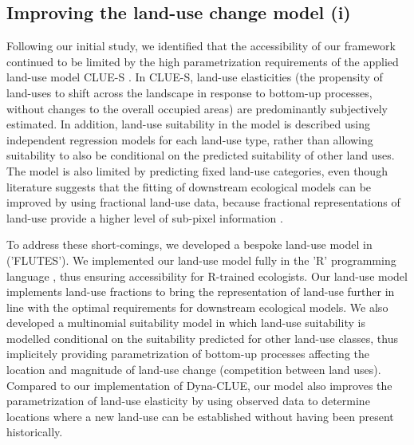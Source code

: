 \subsection{Improving the land-use change model (i)}
\label{ch5:section_lumodel}
Following our initial study, we identified that the accessibility of our framework continued to be limited by the high parametrization requirements of the applied land-use model CLUE-S \citep{verburg_modeling_2002}. In CLUE-S, land-use elasticities (the propensity of land-uses to shift across the landscape in response to bottom-up processes, without changes to the overall occupied areas) are predominantly subjectively estimated. In addition, land-use suitability in the model is described using independent regression models for each land-use type, rather than allowing suitability to also be conditional on the predicted suitability of other land uses. The model is also limited by predicting fixed land-use categories, even though literature suggests that the fitting of downstream ecological models can be improved by using fractional land-use data, because fractional representations of land-use provide a higher level of sub-pixel information  \citep[][]{bevanda_adding_2014, levers_drivers_2014, levers_drivers_2016}. 

To address these short-comings, we developed a bespoke land-use model in  ('FLUTES'). We implemented our land-use model fully in the 'R' programming language \citep{r_development_core_team_r_2008}, thus ensuring accessibility for R-trained ecologists. Our land-use model implements land-use fractions to bring the representation of land-use further in line with the optimal requirements for downstream ecological models. We also developed a multinomial suitability model in which land-use suitability is modelled conditional on the suitability predicted for other land-use classes, thus implicitely providing parametrization of bottom-up processes affecting the location and magnitude of land-use change (competition between land uses). Compared to our implementation of Dyna-CLUE, our model also improves the parametrization of land-use elasticity by using observed data to determine locations where a new land-use can be established without having been present historically.

